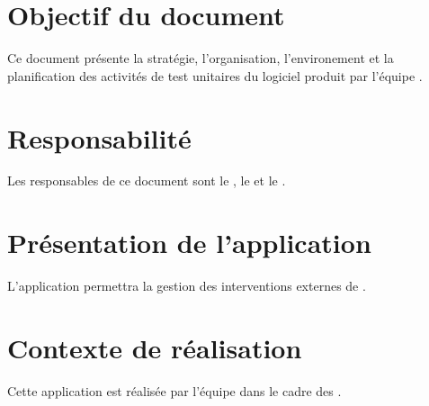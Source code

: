 \section*{Objectif du document}
	Ce document présente la stratégie, l'organisation, l'environement et la planification des activités de test unitaires du logiciel produit par l'équipe \nomEquipe{}.
	
\section*{Responsabilité}
	Les responsables de ce document sont le \CP, le \RQ{} et le \RD.
	
\section*{Présentation de l'application}
	L'application permettra la gestion des interventions externes de \nomClient.
	
\section*{Contexte de réalisation}
	Cette application est réalisée par l'équipe \nomEquipe{} dans le cadre des \PIC.

